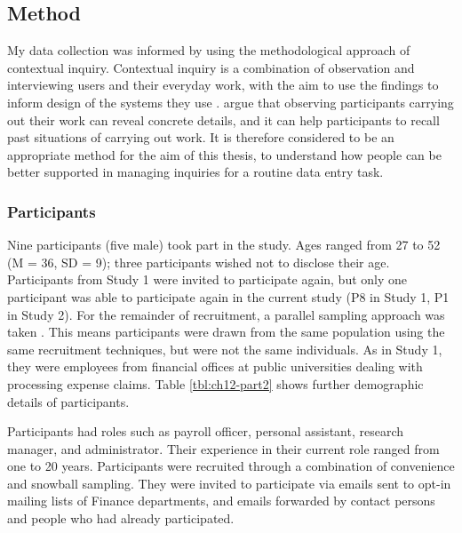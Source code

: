 \subsection{Method}
My data collection was informed by using the methodological approach of contextual inquiry. Contextual inquiry is a combination of observation and interviewing users and their everyday work, with the aim to use the findings to inform design of the systems they use \citep{Holtzblatt2014}.
\citet{Holtzblatt2014} argue that observing participants carrying out their work can reveal concrete details, and it can help participants to recall past situations of carrying out work. It is therefore considered to be an appropriate method for the aim of this thesis, to understand how people can be better supported in managing inquiries for a routine data entry task.

\subsubsection{Participants}
Nine participants (five male) took part in the study. Ages ranged from 27 to 52 (M = 36, SD = 9); three participants wished not to disclose their age. Participants from Study 1 were invited to participate again, but only one participant was able to participate again in the current study (P8 in Study 1, P1 in Study 2).  For the remainder of recruitment, a parallel sampling approach was taken \citep{Onwuegbuzie2008}. This means participants were drawn from the same population using the same recruitment techniques, but were not the same individuals. As in Study 1, they were employees from financial offices at public universities dealing with processing expense claims. Table \ref{tbl:ch12-part2} shows further demographic details of participants.

Participants had roles such as payroll officer, personal assistant, research manager, and administrator. Their experience in their current role ranged from one to 20 years. Participants were recruited through a combination of convenience and snowball sampling. They were invited to participate via emails sent to opt-in mailing lists of Finance departments, and emails forwarded by contact persons and people who had already participated.  

